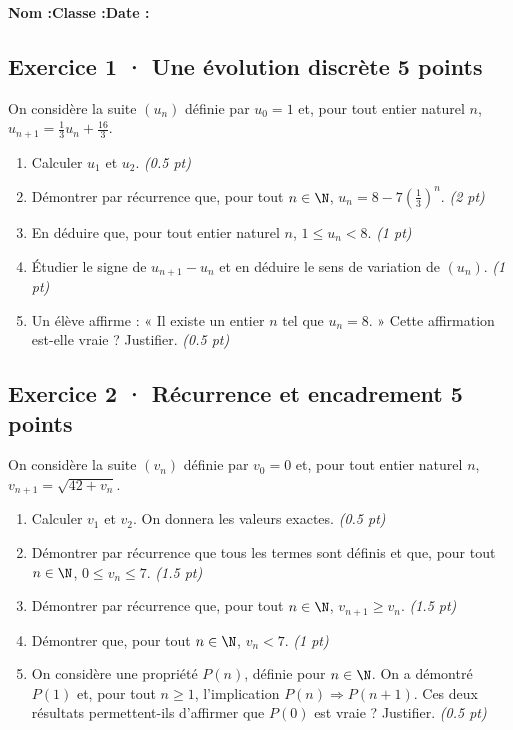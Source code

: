 \smallskip\textbf{Nom :}\enspace\dotfill\quad\textbf{Classe :}\enspace\dotfill\quad\textbf{Date :}\enspace\dotfill

\subsection*{Exercice 1 · Une évolution discrète \hfill 5 points}On considère la suite $(u_n)$ définie par $u_0=1$ et, pour tout entier naturel $n$, $u_{n+1}=\frac{1}{3}u_n+\frac{16}{3}$.

\begin{enumerate}

\item Calculer $u_1$ et $u_2$. \hfill\textit{(\num{0,5} pt)}

\item Démontrer par récurrence que, pour tout $n\in\N$, $u_n=8-7\left(\frac{1}{3}\right)^n$. \hfill\textit{(2 pt)}

\item En déduire que, pour tout entier naturel $n$, $1\le u_n<8$. \hfill\textit{(1 pt)}

\item Étudier le signe de $u_{n+1}-u_n$ et en déduire le sens de variation de $(u_n)$. \hfill\textit{(1 pt)}

\item Un élève affirme : « Il existe un entier $n$ tel que $u_n=8$. » Cette affirmation est-elle vraie ? Justifier. \hfill\textit{(\num{0,5} pt)}

\end{enumerate}

\subsection*{Exercice 2 · Récurrence et encadrement \hfill 5 points}On considère la suite $(v_n)$ définie par $v_0=0$ et, pour tout entier naturel $n$, $v_{n+1}=\sqrt{42+v_n}$.

\begin{enumerate}

\item Calculer $v_1$ et $v_2$. On donnera les valeurs exactes. \hfill\textit{(\num{0,5} pt)}

\item Démontrer par récurrence que tous les termes sont définis et que, pour tout $n\in\N$, $0\le v_n\le7$. \hfill\textit{(\num{1,5} pt)}

\item Démontrer par récurrence que, pour tout $n\in\N$, $v_{n+1}\ge v_n$. \hfill\textit{(\num{1,5} pt)}

\item Démontrer que, pour tout $n\in\N$, $v_n<7$. \hfill\textit{(1 pt)}

\item On considère une propriété $P(n)$, définie pour $n\in\N$. On a démontré $P(1)$ et, pour tout $n\ge1$, l'implication $P(n)\Rightarrow P(n+1)$. Ces deux résultats permettent-ils d'affirmer que $P(0)$ est vraie ? Justifier. \hfill\textit{(\num{0,5} pt)}

\end{enumerate}


